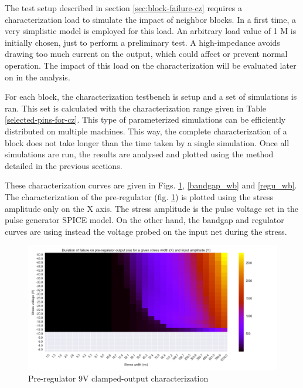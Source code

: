 The test setup described in section \ref{sec:block-failure-cz} requires a characterization load to simulate the impact of neighbor blocks.
In a first time, a very simplistic model is employed for this load.
An arbitrary load value of 1 M\textOmega{} is initially chosen, just to perform a preliminary test.
A high-impedance avoids drawing too much current on the output, which could affect or prevent normal operation.
The impact of this load on the characterization will be evaluated later on in the analysis.

For each block, the characterization testbench is setup and a set of simulations is ran.
This set is calculated with the characterization range given in Table \ref{selected-pins-for-cz}.
This type of parameterized simulations can be efficiently distributed on multiple machines.
This way, the complete characterization of a block does not take longer than the time taken by a single simulation.
Once all simulations are run, the results are analysed and plotted using the method detailed in the previous sections.

These characterization curves are given in Figs. \ref{pre_regu_wb}, \ref{bandgap_wb} and \ref{regu_wb}.
The characterization of the pre-regulator (fig. \ref{pre_regu_wb}) is plotted using the stress amplitude only on the X axis.
The stress amplitude is the pulse voltage set in the pulse generator SPICE model.
On the other hand, the bandgap and regulator curves are using instead the voltage probed on the input net during the stress.


\begin{figure}[!h]
  \centering
  \includegraphics[width=\textwidth]{src/4/figures/preregulator_cz.png}
  \caption{Pre-regulator 9V clamped-output characterization}
  \label{pre_regu_wb}
\end{figure}

